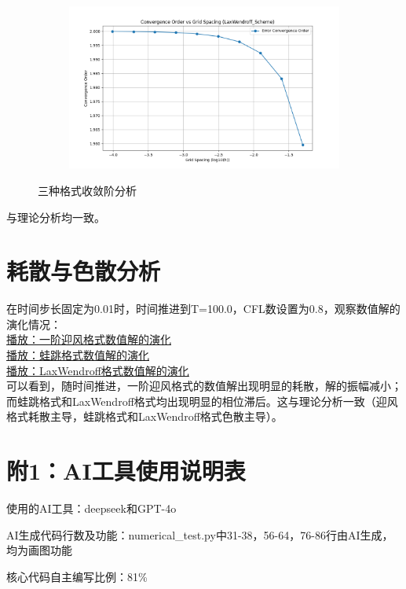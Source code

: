 \documentclass[12pt, a4paper]{article}
\begin{document}
\begin{figure}[htbp]
\begin{subfigure}[b]{0.45\textwidth}
    \end{subfigure}
    \vspace{0.5cm}
    \centering
    \begin{subfigure}[b]{0.45\textwidth} 
        \centering
        \includegraphics[width=\textwidth]{./pictures/Convergence_Order_of_LaxWendroff_Scheme.png} 
    \end{subfigure}
    \caption{三种格式收敛阶分析}
\end{figure}
与理论分析均一致。

\section{耗散与色散分析}
在时间步长固定为0.01时，时间推进到T=100.0，CFL数设置为0.8，观察数值解的演化情况：\\
\href{run:./pictures/solution_evolution_of_Upwind_Scheme.mp4}{播放：一阶迎风格式数值解的演化}\\
\href{run:./pictures/solution_evolution_of_LeapFrog_Scheme.mp4}{播放：蛙跳格式数值解的演化}\\
\href{run:./pictures/solution_evolution_of_LaxWendroff_Scheme.mp4}{播放：LaxWendroff格式数值解的演化}\\

可以看到，随时间推进，一阶迎风格式的数值解出现明显的耗散，解的振幅减小；而蛙跳格式和LaxWendroff格式均出现明显的相位滞后。这与理论分析一致（迎风格式耗散主导，蛙跳格式和LaxWendroff格式色散主导）。

\section*{附1：AI工具使用说明表}
使用的AI工具：deepseek和GPT-4o

AI生成代码行数及功能：numerical\_test.py中31-38，56-64，76-86行由AI生成，均为画图功能

核心代码自主编写比例：81\%
\end{document}
